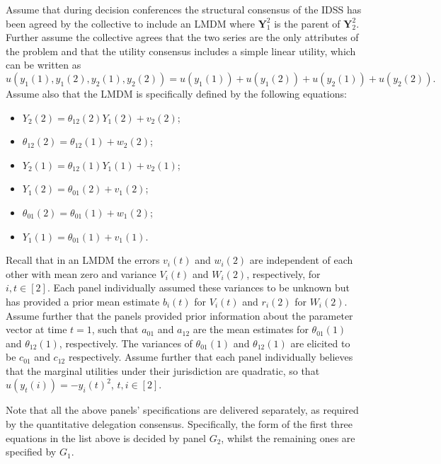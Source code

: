 Assume that during decision conferences the structural consensus of the IDSS has been agreed by the collective to include an LMDM where $\bm{Y}^2_1$ is the parent of $\bm{Y}_2^2$. Further assume the collective agrees that the two series are the only attributes of the problem and that the utility consensus includes a simple linear utility, which can be written as      
\begin{equation}
\label{eq:utfact2}
u(y_1 (1),y_1 (2),y_2 (1),y_2 (2))=u(y_1 (1))+u(y_1 (2))+                                                               u(y_2 (1))+u(y_2 (2)) .
\end{equation}
Assume also that the LMDM is specifically defined by the following equations:
\begin{multicols}{2}
\begin{itemize}
\item	$Y_2 (2)=\theta_{12}(2) Y_1 (2)+v_2 (2)$;
\item	$\theta_{12}(2)=\theta_{12}(1)+w_2 (2)$;
\item 	$Y_2(1)=\theta_{12}(1) Y_1 (1)+v_2 (1)$;
\item $Y_1(2)=\theta_{01} (2)+v_1 (2)$;
\item  $\theta_{01}(2)=\theta_{01} (1)+w_1 (2)$;
\item $Y_1(1)=\theta_{01} (1)+v_1 (1)$.
\end{itemize}
\end{multicols}
Recall that in an LMDM the errors $v_i(t)$ and  $w_i (2)$ are independent of each other with mean zero and variance $V_i(t)$   and $W_i (2)$, respectively, for $i,t\in[2]$. Each panel individually assumed these variances to be unknown but has provided a prior mean estimate $b_i (t)$ for $V_i(t)$ and $r_i(2)$ for $W_i (2)$. Assume further that the panels provided prior information about the parameter vector at time $t=1$, such that $a_{01} $ and $a_{12}$ are the mean estimates for $\theta_{01}(1)$ and  $\theta_{12}(1)$, respectively. The variances of  $\theta_{01}(1)$ and  $\theta_{12}(1)$ are elicited to be $c_{01}$ and $c_{12}$ respectively. Assume further that each panel individually believes that the marginal utilities under their jurisdiction are quadratic, so that $u(y_t (i))=-y_i (t)^2$, $t,i\in[2]$.
       
Note that all the above panels’ specifications are delivered separately, as required by the quantitative delegation consensus. Specifically, the form of the first three equations in the list above is decided by panel  $G_2$, whilst the remaining ones are specified by $G_1$.  
      

